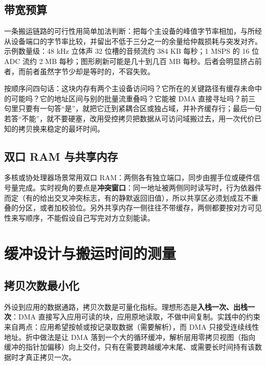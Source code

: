 \documentclass[12pt,a4paper,fontset=fandol]{ctexbook}
\begin{document}
\subsection{带宽预算}

一条搬运链路的可行性用简单加法判断：把每个主设备的峰值字节率相加，与所经从设备端口的字节率比较，并留出不低于三分之一的余量给仲裁损耗与突发对齐。示例数量级：48 kHz 立体声 32 位槽的音频流约 384 KB 每秒；1 MSPS 的 16 位 ADC 流约 2 MB 每秒；图形刷新可能是几十到几百 MB 每秒。后者会明显挤占前者，而前者虽然字节少却是等时的，不容失败。

\begin{bestpractice}[title={把关键 buffer 放到 TCM 或独占 RAM 域的判据}]
按顺序问四句话：这块内存有两个主设备访问吗？它所在的关键路径有缓存未命中的可能吗？它的地址区间与别的批量流重叠吗？它能被 DMA 直接寻址吗？前三句里只要有一句答``是''，就把它迁到紧耦合区或独占域，并补齐缓存行；最后一句若答``不能''，就不要硬塞，改用受控拷贝把数据从可访问域搬过去，用一次代价已知的拷贝换来稳定的最坏时间。
\end{bestpractice}

\subsection{双口 RAM 与共享内存}

多核或协处理器场景常用双口 RAM：两侧各有独立端口，同步由握手位或硬件信号量完成。实时视角的要点是\textbf{冲突窗口}：同一地址被两侧同时读写时，行为依器件而定（有的给出交叉冲突标志，有的静默返回旧值），所以共享区必须划成互不重叠的分区，或者加校验位。另外共享内存一侧往往不带缓存，两侧都要按对方可见性来写顺序，不能假设自己写完对方立刻能读。

\section{缓冲设计与搬运时间的测量}

\subsection{拷贝次数最小化}

外设到应用的数据通路，拷贝次数是可量化指标。理想形态是\textbf{入栈一次、出栈一次}：DMA 直接写入应用可读的块，应用原地读取，不做中间复制。实践中的约束来自两点：应用希望按帧或按记录取数据（需要解析），而 DMA 只接受连续线性地址。折中做法是让 DMA 落到一个大的循环缓冲，解析层用零拷贝视图（指向缓冲的指针加偏移）向上交付，只有在需要跨越缓冲末尾、或需要长时间持有该数据时才真正拷贝一次。
\end{document}
